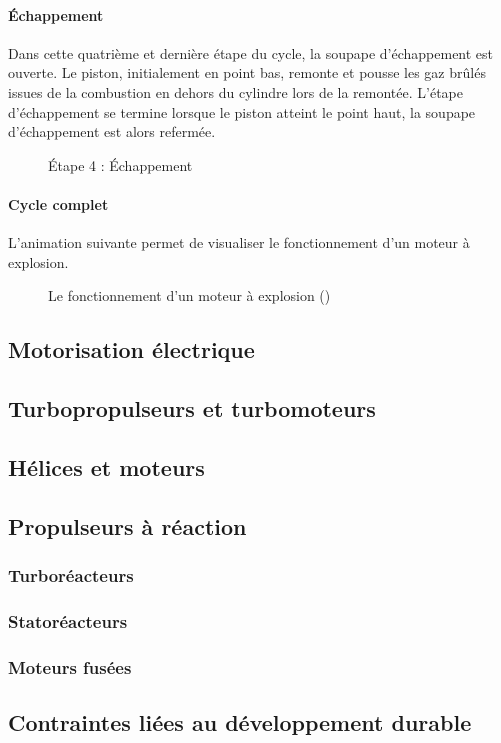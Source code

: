 		
		\paragraph{Échappement}
		
		Dans cette quatrième et dernière étape du cycle, la soupape d'échappement est ouverte. Le piston, initialement en point bas, remonte et pousse les gaz brûlés issues de la combustion en dehors du cylindre lors de la remontée. L'étape d'échappement se termine lorsque le piston atteint le point haut, la soupape d'échappement est alors refermée.
		
		\begin{figure}[H]
  		\centering
		
  		\caption{Étape 4 : Échappement}
		\end{figure}	
		
		\paragraph{Cycle complet}
		
		L'animation suivante permet de visualiser le fonctionnement d'un moteur à explosion.	
		
		\renewcommand{\echelleTikz}{0.5}
		\begin{figure}[H]
  		\centering
		
  		\caption{Le fonctionnement d'un moteur à explosion (\cite{tikz::schemaMoteurPistonAnime})}
		\end{figure}	
	
		
	
	\subsection{Motorisation électrique}
	
	\subsection{Turbopropulseurs et turbomoteurs}
	
	\subsection{Hélices et moteurs}
	
	\subsection{Propulseurs à réaction}
		\subsubsection{Turboréacteurs}
	
		\subsubsection{Statoréacteurs}
	
		\subsubsection{Moteurs fusées}
		
	\subsection{Contraintes liées au développement durable}
